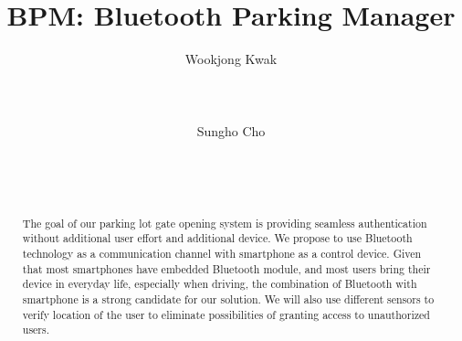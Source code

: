 \documentclass{sig-alternate-ipsn13}
\begin{document}
\title{BPM: Bluetooth Parking Manager}


\author{
\alignauthor
Wookjong Kwak\\
       \\
       \\
       \\
\alignauthor
Sungho Cho\\
       \\
       \\
       \\
}

\maketitle
\begin{abstract}

The goal of our parking lot gate opening system is providing seamless authentication without additional user effort and additional device. We propose to use Bluetooth technology as a communication channel with smartphone as a control device. Given that most smartphones have embedded Bluetooth module, and most users bring their device in everyday life, especially when driving, the combination of Bluetooth with smartphone is a strong candidate for our solution. We will also use different sensors to verify location of the user to eliminate possibilities of granting access to unauthorized users.

\end{abstract}










%

%
%


\end{document}
